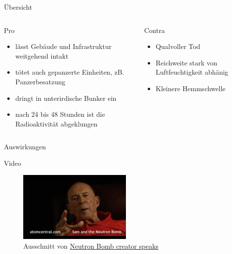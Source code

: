 \begin{frame}{Übersicht}
	\begin{columns}[onlytextwidth]
		\begin{column}{0.45\textwidth}
			\begin{block}{Pro}
				\begin{itemize}
					\item lässt Gebäude und Infrastruktur weitgehend intakt
					\item tötet auch gepanzerte Einheiten, zB. Panzerbesatzung
					\item dringt in unterirdische Bunker ein
					\item nach 24 bis 48 Stunden ist die Radioaktivität abgeklungen
				\end{itemize}
			\end{block}
		\end{column}
		\begin{column}{0.45\textwidth}
			\begin{block}{Contra}
				\begin{itemize}
					\item Qualvoller Tod
					\item Reichweite stark von Luftfeuchtigkeit abhänig
					\item Kleinere Hemmschwelle
				\end{itemize}
			\end{block}
		\end{column}
	\end{columns}
\end{frame}
\begin{frame}{Auswirkungen}
	\begin{block}{Video}
		\begin{figure}
			\centering
			\includegraphics[width=0.5\textwidth]{img/sam_cohen_thumbnail.jpg}
			\caption{Ausschnitt von \href{https://www.youtube.com/watch?v=z_QFXGxw6Tk}{Neutron Bomb creator speaks} }
		\end{figure}
	\end{block}
\end{frame}
